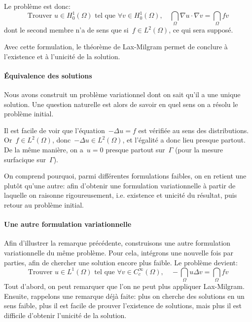 Le problème est donc:
\begin{equation}
\text{Trouver } u \in H^1_0(\Omega) \text{ tel que }
\forall v\in H^1_0(\Omega),\quad
\dint_\Omega \nabla u\cdot\nabla v = \dint_\Omega fv
\end{equation}
dont le second membre n'a de sens que si~$f\in L^2(\Omega)$, ce qui sera supposé.

Avec cette formulation, le théorème de Lax-Milgram permet de conclure à l'existence et à l'unicité de la solution.

\medskip{}
\paragraph{Équivalence des solutions}
Nous avons construit un problème variationnel dont on sait qu'il a une unique solution. Une question naturelle est alors de savoir en quel sens on a résolu le problème initial.

Il est facile de voir que l'équation~$-\Delta u = f$ est vérifiée au sens des distributions. Or~$f\in L^2(\Omega)$, donc~$-\Delta u \in L^2(\Omega)$, et l'égalité a donc lieu presque partout. De la même manière, on a~$u = 0$ presque partout sur~$\Gamma$ (pour la mesure surfacique sur~$\Gamma$).

On comprend pourquoi, parmi différentes formulations faibles, on en retient une plutôt qu'une autre: afin d'obtenir une formulation variationnelle à partir de laquelle on raisonne rigoureusement, i.e. existence et unicité du résultat, puis retour au problème initial.

\medskip{}
\paragraph{Une autre formulation variationnelle}
Afin d'illustrer la remarque précédente, construisons une autre formulation variationnelle du même problème. Pour cela, intégrons une nouvelle fois par parties, afin de chercher une solution encore plus faible. Le problème devient:
\begin{equation}
\text{Trouver } u \in L^1(\Omega) \text{ tel que }
\forall v\in C_c^\infty(\Omega),\quad
-\dint_\Omega u\Delta v = \dint_\Omega fv
\end{equation}
Tout d'abord, on peut remarquer que l'on ne peut plus appliquer Lax-Milgram. Ensuite, rappelons une remarque déjà faite: plus on cherche des solutions en un sens faible, plus il est facile de prouver l'existence de solutions, mais plus il est difficile d'obtenir l'unicité de la solution.

